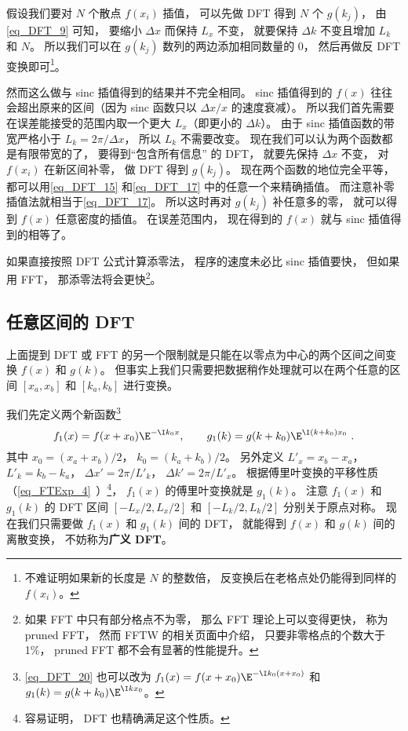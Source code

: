 假设我们要对 $N$ 个散点 $f(x_i)$ 插值， 可以先做 DFT 得到 $N$ 个 $g(k_j)$， 由\autoref{eq_DFT_9} 可知， 要缩小 $\Delta x$ 而保持 $L_x$ 不变， 就要保持 $\Delta k$ 不变且增加 $L_k$ 和 $N$。 所以我们可以在 $g(k_j)$ 数列的两边添加相同数量的 0， 然后再做反 DFT 变换即可\footnote{不难证明如果新的长度是 $N$ 的整数倍， 反变换后在老格点处仍能得到同样的 $f(x_i)$。}。

然而这么做与 sinc 插值得到的结果并不完全相同。 sinc 插值得到的 $f(x)$ 往往会超出原来的区间（因为 sinc 函数只以 $\Delta x/x$ 的速度衰减）。 所以我们首先需要在误差能接受的范围内取一个更大 $L_x$（即更小的 $\Delta k$）。 由于 sinc 插值函数的带宽严格小于 $L_k = 2\pi/\Delta x$， 所以 $L_k$ 不需要改变。 现在我们可以认为两个函数都是有限带宽的了， 要得到“包含所有信息” 的 DFT， 就要先保持 $\Delta x$ 不变， 对 $f(x_i)$ 在新区间补零， 做 DFT 得到 $g(k_j)$。 现在两个函数的地位完全平等， 都可以用\autoref{eq_DFT_15} 和\autoref{eq_DFT_17} 中的任意一个来精确插值。 而注意补零插值法就相当于\autoref{eq_DFT_17}。 所以这时再对 $g(k_j)$ 补任意多的零， 就可以得到 $f(x)$ 任意密度的插值。 在误差范围内， 现在得到的 $f(x)$ 就与 sinc 插值得到的相等了。

如果直接按照 DFT 公式计算添零法， 程序的速度未必比 sinc 插值要快， 但如果用 FFT， 那添零法将会更快\footnote{如果 FFT 中只有部分格点不为零， 那么 FFT 理论上可以变得更快， 称为 pruned FFT， 然而 FFTW 的相关页面中介绍， 只要非零格点的个数大于 1\%， pruned FFT 都不会有显著的性能提升。}。

\subsection{任意区间的 DFT}\label{sub_DFT_1}
上面提到 DFT 或 FFT 的另一个限制就是只能在以零点为中心的两个区间之间变换 $f(x)$ 和 $g(k)$。 但事实上我们只需要把数据稍作处理就可以在两个任意的区间 $[x_a, x_b]$ 和 $[k_a, k_b]$ 进行变换。

我们先定义两个新函数\footnote{\autoref{eq_DFT_20} 也可以改为 $f_1(x) = f(x + x_0)\E^{-\I k_0 (x+x_0)}$ 和 $g_1(k) = g(k + k_0)\E^{\I k x_0}$。}
\begin{equation}\label{eq_DFT_20}
f_1(x) = f(x + x_0)\E^{-\I k_0 x}, \qquad
g_1(k) = g(k + k_0)\E^{\I (k+k_0) x_0}~.
\end{equation}
其中 $x_0 = (x_a + x_b)/2$，  $k_0 = (k_a + k_b)/2$。 另外定义 $L'_x = x_b - x_a$， $L'_k = k_b-k_a$， $\Delta x' = 2\pi/L'_k$， $\Delta k' = 2\pi/L'_x$。 根据傅里叶变换的平移性质（\autoref{eq_FTExp_4}~）\footnote{容易证明， DFT 也精确满足这个性质。}， $f_1(x)$ 的傅里叶变换就是 $g_1(k)$。 注意 $f_1(x)$ 和 $g_1(k)$ 的 DFT 区间 $[-L_x/2, L_x/2]$ 和 $[-L_k/2, L_k/2]$ 分别关于原点对称。 现在我们只需要做 $f_1(x)$ 和 $g_1(k)$ 间的  DFT， 就能得到 $f(x)$ 和 $g(k)$ 间的离散变换， 不妨称为\textbf{广义 DFT}。

